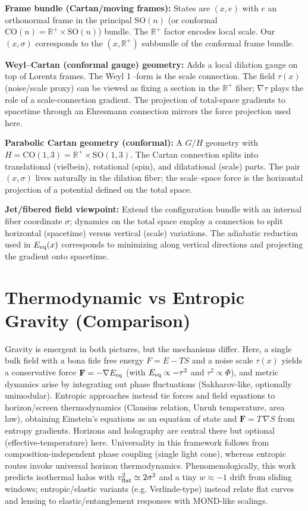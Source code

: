 \documentclass[11pt]{article}
\begin{document}
\textbf{Frame bundle (Cartan/moving frames):} States are $(x,e)$ with $e$ an orthonormal frame in the principal $\mathrm{SO}(n)$ (or conformal $\mathrm{CO}(n)=\mathbb R^+\times \mathrm{SO}(n)$) bundle. The $\mathbb R^+$ factor encodes local scale. Our $(x,\sigma)$ corresponds to the $(x,\mathbb R^+)$ subbundle of the conformal frame bundle.

\textbf{Weyl--Cartan (conformal gauge) geometry:} Adds a local dilation gauge on top of Lorentz frames. The Weyl 1\,--form is the scale connection. The field $\tau(x)$ (noise/scale proxy) can be viewed as fixing a section in the $\mathbb R^+$ fiber; $\nabla\tau$ plays the role of a scale-connection gradient. The projection of total-space gradients to spacetime through an Ehresmann connection mirrors the force projection used here.

\textbf{Parabolic Cartan geometry (conformal):} A $G/H$ geometry with $H=\mathrm{CO}(1,3)=\mathbb R^+\times \mathrm{SO}(1,3)$. The Cartan connection splits into translational (vielbein), rotational (spin), and dilatational (scale) parts. The pair $(x,\sigma)$ lives naturally in the dilation fiber; the scale--space force is the horizontal projection of a potential defined on the total space.

\textbf{Jet/fibered field viewpoint:} Extend the configuration bundle with an internal fiber coordinate $\sigma$; dynamics on the total space employ a connection to split horizontal (spacetime) versus vertical (scale) variations. The adiabatic reduction used in $E_{\rm eq}(x)$ corresponds to minimizing along vertical directions and projecting the gradient onto spacetime.

\section{Thermodynamic vs Entropic Gravity (Comparison)}\label{si:compare}
Gravity is emergent in both pictures, but the mechanisms differ. Here, a single bulk field with a bona fide free energy $F=E-TS$ and a noise scale $\tau(x)$ yields a conservative force $\mathbf F=-\nabla E_{\rm eq}$ (with $E_{\rm eq}\propto-\tau^2$ and $\tau^2\propto\Phi$), and metric dynamics arise by integrating out phase fluctuations (Sakharov-like, optionally unimodular). Entropic approaches instead tie forces and field equations to horizon/screen thermodynamics (Clausius relation, Unruh temperature, area law), obtaining Einstein's equations as an equation of state and $\mathbf F=T\,\nabla S$ from entropy gradients. Horizons and holography are central there but optional (effective-temperature) here. Universality in this framework follows from composition-independent phase coupling (single light cone), whereas entropic routes invoke universal horizon thermodynamics. Phenomenologically, this work predicts isothermal halos with $v_{\rm flat}^2\simeq2\sigma^2$ and a tiny $w\approx-1$ drift from sliding windows; entropic/elastic variants (e.g. Verlinde-type) instead relate flat curves and lensing to elastic/entanglement responses with MOND-like scalings.
\end{document}
